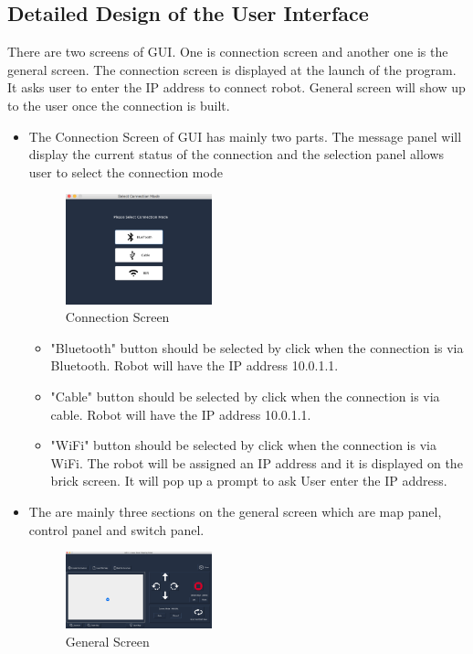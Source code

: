 \documentclass[12pt,a4paper]{article}
\begin{document}
\subsection{Detailed Design of the User Interface}
There are two screens of GUI. One is connection screen and another one is the general screen. The connection screen is displayed at the launch of the program. It asks user to enter the IP address to connect robot. General screen will show up to the user once the connection is built. \\
\begin{itemize}
\item 
The Connection Screen of GUI has mainly two parts. The message panel will display the current status of the connection and the selection panel allows user to select the connection mode\\
\begin{figure}[!htb]
\centering
\includegraphics[width=0.4\textwidth]{ConnectionPage}
\caption{Connection Screen} 
\end{figure}

\begin{itemize}
\item "Bluetooth" button should be selected by click when the connection is via Bluetooth. Robot will have the IP address 10.0.1.1.
\item "Cable" button should be selected by click when the connection is via cable. Robot will have the IP address 10.0.1.1.
\item "WiFi" button should be selected by click when the connection is via WiFi. The robot will be assigned an IP address and it is displayed on the brick screen. It will pop up a prompt to ask User enter the IP address.

\end{itemize}

\newpage

\item
The are mainly three sections on the general screen which are map panel, control panel and switch panel. \\
\begin{figure}[!htb]
\centering
\includegraphics[width=0.4\textwidth]{GeneralPage}
\caption{General Screen} 
\end{figure}


\end{itemize}
\end{document}
